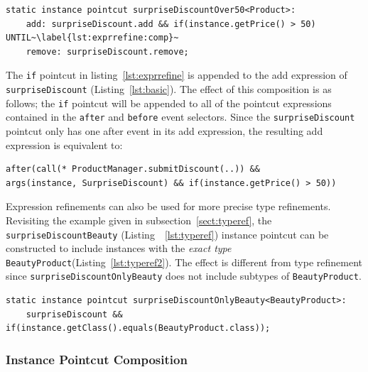 \documentclass[10pt]{sigplanconf}
\newcommand{\lstinln}[1]{\lstinline~#1~}
\begin{document}
\begin{lstlisting}[float=h!, caption={Expression refinement of \lstinln{surpriseDiscount}(Listing~\ref{lst:basic}) instance pointcut}, label={lst:exprrefine}]
static instance pointcut surpriseDiscountOver50<Product>:
	add: surpriseDiscount.add && if(instance.getPrice() > 50) UNTIL~\label{lst:exprrefine:comp}~
    remove: surpriseDiscount.remove;
\end{lstlisting}


The \lstinln{if} pointcut in listing~\ref{lst:exprrefine} is appended to the add expression of \lstinln{surpriseDiscount} (Listing~\ref{lst:basic}). The effect of this composition is  as follows; the \lstinln{if} pointcut will be appended to all of the pointcut expressions contained in the \lstinln{after} and \lstinln{before} event selectors. Since the  \lstinln{surpriseDiscount} pointcut only has one after event in its add expression, the resulting add expression is equivalent to:

\begin{lstlisting}[numbers=none]
after(call(* ProductManager.submitDiscount(..)) &&
args(instance, SurpriseDiscount) && if(instance.getPrice() > 50))
\end{lstlisting}

Expression refinements can also be used for more precise type refinements. Revisiting the example given in subsection~\ref{sect:typeref}, the \lstinln{surpriseDiscountBeauty} (Listing~~\ref{lst:typeref}) instance pointcut can be constructed to include instances with the \emph{exact type} \lstinln{BeautyProduct}(Listing~\ref{lst:typeref2}). The effect is different from type refinement since \lstinln{surpriseDiscountOnlyBeauty} does not include subtypes of \lstinln{BeautyProduct}.

\begin{lstlisting}[float=h!,caption={Type refinement by expression refinement}, label={lst:typeref2}]
static instance pointcut surpriseDiscountOnlyBeauty<BeautyProduct>:
	surpriseDiscount && if(instance.getClass().equals(BeautyProduct.class));
\end{lstlisting}


\subsubsection{Instance Pointcut Composition}
\label{sect:compo}
\end{document}
